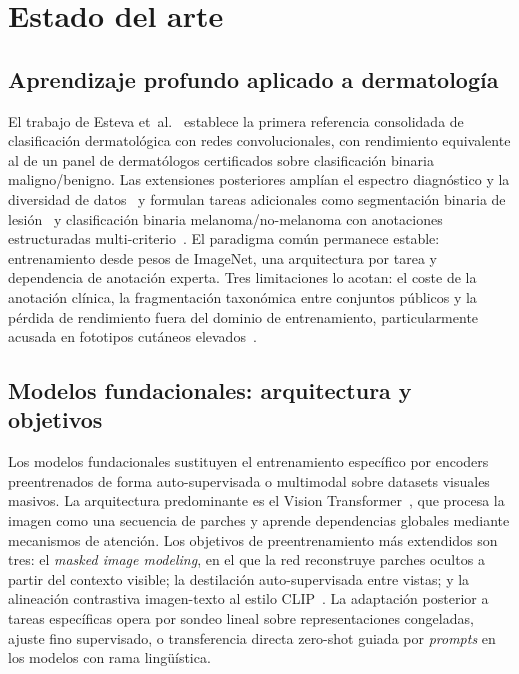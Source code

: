 
\chapter{Estado del arte}
\label{cap:sota}

\section{Aprendizaje profundo aplicado a dermatología}
\label{sec:dl-dermatologia}

El trabajo de Esteva et~al.~\cite{esteva2017} establece la primera
referencia consolidada de clasificación dermatológica con redes
convolucionales, con rendimiento equivalente al de un panel de
dermatólogos certificados sobre clasificación binaria
maligno/benigno. Las extensiones posteriores amplían el espectro
diagnóstico y la diversidad de datos~\cite{tschandl2018,ham10000} y
formulan tareas adicionales como segmentación binaria de
lesión~\cite{isic2018} y clasificación binaria
melanoma/no-melanoma con anotaciones estructuradas
multi-criterio~\cite{kawahara2019}. El paradigma común permanece
estable: entrenamiento desde pesos de ImageNet, una arquitectura por
tarea y dependencia de anotación experta. Tres limitaciones lo
acotan: el coste de la anotación clínica, la fragmentación
taxonómica entre conjuntos públicos y la pérdida de rendimiento
fuera del dominio de entrenamiento, particularmente acusada en
fototipos cutáneos elevados~\cite{fitzpatrick17k,ddi}.

\section{Modelos fundacionales: arquitectura y objetivos}
\label{sec:fundacionales-base}

Los modelos fundacionales sustituyen el entrenamiento específico por
encoders preentrenados de forma auto-supervisada o multimodal sobre
datasets visuales masivos. La arquitectura predominante es el Vision
Transformer~\cite{vit2021}, que procesa la imagen como una secuencia
de parches y aprende dependencias globales mediante mecanismos de
atención. Los objetivos de preentrenamiento más extendidos son tres:
el \emph{masked image modeling}, en el que la red reconstruye
parches ocultos a partir del contexto visible; la destilación
auto-supervisada entre vistas; y la alineación contrastiva
imagen-texto al estilo CLIP~\cite{clip2021}. La adaptación posterior
a tareas específicas opera por sondeo lineal sobre representaciones
congeladas, ajuste fino supervisado, o transferencia directa
zero-shot guiada por \emph{prompts} en los modelos con rama
lingüística.

